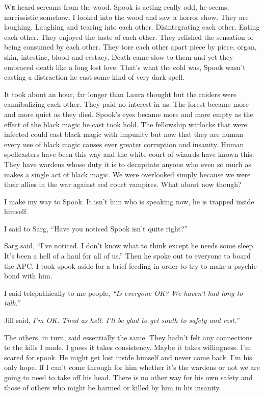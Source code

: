\lettrine[lines=2,lraise=0]{W}e heard screams from the wood. Spook is acting really odd, he seems, narcissistic somehow. I looked into the wood and saw a horror show. They are laughing. Laughing and tearing into each other. Disintegrating each other. Eating each other. They enjoyed the taste of each other. They relished the sensation of being consumed by each other. They tore each other apart piece by piece, organ, skin, intestine, blood and ecstacy. Death came slow to them and yet they embraced death like a long lost love. That's what the cold was, Spook wasn't casting a distraction he cast some kind of very dark spell.

It took about an hour, far longer than Laura thought but the raiders were cannibalizing each other. They paid no interest in us. The forest became more and more quiet as they died. Spook's eyes became more and more empty as the effect of the black magic he cast took hold. The fellowship warlocks that were infected could cast black magic with impunity but now that they are human every use of black magic causes ever greater corruption and insanity. Human spellcasters have been this way and the white court of wizards have known this. They have wardens whose duty it is to decapitate anyone who even so much as makes a single act of black magic. We  were overlooked simply because we were their allies in the war against red court vampires.  What about now though?

I make my way to Spook. It isn't him who is speaking now, he is trapped inside himself.

I said to Sarg, ``Have you noticed Spook isn't quite right?''

Sarg said, ``I've noticed. I don't know what to think except he needs some sleep. It's been a hell of a haul for all of us.'' Then he spoke out to everyone to board the APC. I took spook aside for a brief feeding in order to try to make a psychic bond with him.

I said telepathically to me people, \textit{``Is everyone OK? We haven't had long to talk.''}

Jill said, \textit{I'm OK. Tired as hell. I'll be glad to get south to safety and rest.''}

The others, in turn, said essentially the same. They hadn't felt any connections to the kills I made. I guess it takes consistency. Maybe it takes willingness. I'm scared for spook. He might get lost inside himself and never come back. I'm his only hope. If I can't come through for him whether it's the wardens or not we are going to need to take off his head. There is no other way for his own safety and those of others who might be harmed or killed by him in his insanity.

